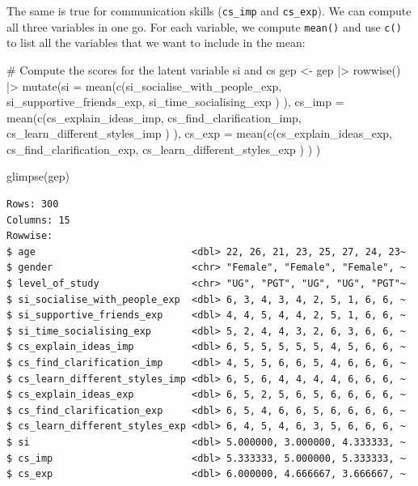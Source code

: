 \documentclass[
  letterpaper,
  DIV=11,
  numbers=noendperiod]{scrreprt}
\newenvironment{Shaded}{\begin{snugshade}}{\end{snugshade}}
\newcommand{\AttributeTok}[1]{\textcolor[rgb]{0.40,0.45,0.13}{#1}}
\newcommand{\CommentTok}[1]{\textcolor[rgb]{0.37,0.37,0.37}{#1}}
\newcommand{\FunctionTok}[1]{\textcolor[rgb]{0.28,0.35,0.67}{#1}}
\newcommand{\NormalTok}[1]{\textcolor[rgb]{0.00,0.23,0.31}{#1}}
\newcommand{\OtherTok}[1]{\textcolor[rgb]{0.00,0.23,0.31}{#1}}
\newcommand{\SpecialCharTok}[1]{\textcolor[rgb]{0.37,0.37,0.37}{#1}}
\begin{document}
The same is true for communication skills (\texttt{cs\_imp} and
\texttt{cs\_exp}). We can compute all three variables in one go. For
each variable, we compute \texttt{mean()} and use \texttt{c()} to list
all the variables that we want to include in the mean:

\begin{Shaded}
\begin{Highlighting}[]
\CommentTok{\# Compute the scores for the latent variable \textquotesingle{}si\textquotesingle{} and \textquotesingle{}cs\textquotesingle{}}
\NormalTok{gep }\OtherTok{\textless{}{-}}
\NormalTok{  gep }\SpecialCharTok{|\textgreater{}}
  \FunctionTok{rowwise}\NormalTok{() }\SpecialCharTok{|\textgreater{}}
  \FunctionTok{mutate}\NormalTok{(}\AttributeTok{si =} \FunctionTok{mean}\NormalTok{(}\FunctionTok{c}\NormalTok{(si\_socialise\_with\_people\_exp,}
\NormalTok{                     si\_supportive\_friends\_exp,}
\NormalTok{                     si\_time\_socialising\_exp}
\NormalTok{                     )}
\NormalTok{                   ),}
         \AttributeTok{cs\_imp =} \FunctionTok{mean}\NormalTok{(}\FunctionTok{c}\NormalTok{(cs\_explain\_ideas\_imp,}
\NormalTok{                         cs\_find\_clarification\_imp,}
\NormalTok{                         cs\_learn\_different\_styles\_imp}
\NormalTok{                         )}
\NormalTok{                       ),}
         \AttributeTok{cs\_exp =} \FunctionTok{mean}\NormalTok{(}\FunctionTok{c}\NormalTok{(cs\_explain\_ideas\_exp,}
\NormalTok{                         cs\_find\_clarification\_exp,}
\NormalTok{                         cs\_learn\_different\_styles\_exp}
\NormalTok{                         )}
\NormalTok{                       )}
\NormalTok{         )}

\FunctionTok{glimpse}\NormalTok{(gep)}
\end{Highlighting}
\end{Shaded}

\begin{verbatim}
Rows: 300
Columns: 15
Rowwise: 
$ age                           <dbl> 22, 26, 21, 23, 25, 27, 24, 23~
$ gender                        <chr> "Female", "Female", "Female", ~
$ level_of_study                <chr> "UG", "PGT", "UG", "UG", "PGT"~
$ si_socialise_with_people_exp  <dbl> 6, 3, 4, 3, 4, 2, 5, 1, 6, 6, ~
$ si_supportive_friends_exp     <dbl> 4, 4, 5, 4, 4, 2, 5, 1, 6, 6, ~
$ si_time_socialising_exp       <dbl> 5, 2, 4, 4, 3, 2, 6, 3, 6, 6, ~
$ cs_explain_ideas_imp          <dbl> 6, 5, 5, 5, 5, 5, 4, 5, 6, 6, ~
$ cs_find_clarification_imp     <dbl> 4, 5, 5, 6, 6, 5, 4, 6, 6, 6, ~
$ cs_learn_different_styles_imp <dbl> 6, 5, 6, 4, 4, 4, 4, 6, 6, 6, ~
$ cs_explain_ideas_exp          <dbl> 6, 5, 2, 5, 6, 5, 6, 6, 6, 6, ~
$ cs_find_clarification_exp     <dbl> 6, 5, 4, 6, 6, 5, 6, 6, 6, 6, ~
$ cs_learn_different_styles_exp <dbl> 6, 4, 5, 4, 6, 3, 5, 6, 6, 6, ~
$ si                            <dbl> 5.000000, 3.000000, 4.333333, ~
$ cs_imp                        <dbl> 5.333333, 5.000000, 5.333333, ~
$ cs_exp                        <dbl> 6.000000, 4.666667, 3.666667, ~
\end{verbatim}
\end{document}
